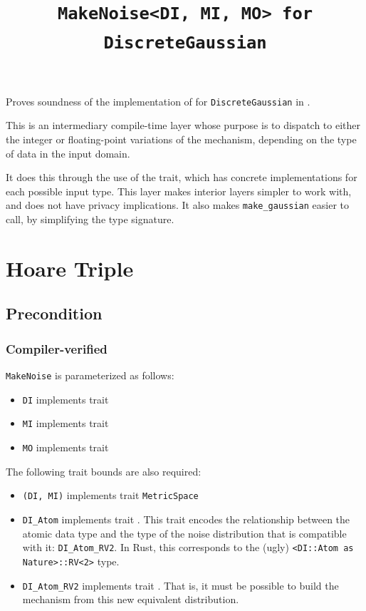\documentclass{article}
\title{\texttt{MakeNoise<DI, MI, MO> for DiscreteGaussian}}
\author{\MichaelShoemateAuthor}
\date{}
\begin{document}
\maketitle

\contrib
Proves soundness of the implementation of 
for \texttt{DiscreteGaussian} in .

This is an intermediary compile-time layer whose purpose is
to dispatch to either the integer or floating-point variations of the mechanism,
depending on the type of data in the input domain.

It does this through the use of the  trait,
which has concrete implementations for each possible input type.
This layer makes interior layers simpler to work with, and does not have privacy implications.
It also makes \texttt{make\_gaussian} easier to call,
by simplifying the type signature.

\section{Hoare Triple}
\subsection*{Precondition}
\subsubsection*{Compiler-verified}
\texttt{MakeNoise} is parameterized as follows:
\begin{itemize}
    \item \texttt{DI} implements trait 
    \item \texttt{MI} implements trait 
    \item \texttt{MO} implements trait 
\end{itemize}

The following trait bounds are also required:
\begin{itemize}
    \item \texttt{(DI, MI)} implements trait \texttt{MetricSpace}
    \item \texttt{DI\_Atom} implements trait .
        This trait encodes the relationship between the atomic data type
        and the type of the noise distribution that is compatible with it: \texttt{DI\_Atom\_RV2}.
        In Rust, this corresponds to the (ugly) \texttt{<DI::Atom as Nature>::RV<2>} type.
    \item \texttt{DI\_Atom\_RV2} implements trait .
        That is, it must be possible to build the mechanism from this new equivalent distribution.
\end{itemize}
\end{document}
